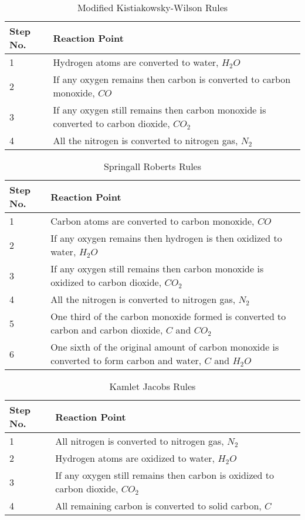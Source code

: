 \begin{table}[!h]
\centering
\begin{tabular}{|l|p{12cm}|}
\hline
Step No.       & Reaction Point \\
\hline \hline
1 & Hydrogen atoms are converted to water, $H_2O$         \\
\hline
2 & If any oxygen remains then carbon is converted to carbon monoxide, $CO$          \\
\hline
3 & If any oxygen still remains then carbon monoxide is converted to carbon dioxide, $CO_2$         \\
\hline
4 & All the nitrogen is converted to nitrogen gas, $N_2$          \\
\hline
\end{tabular}
\caption{Modified Kistiakowsky-Wilson Rules}
\label{m-k-w_rules}
\end{table}

\begin{table}[!h]
\centering
\begin{tabular}{|l|p{12cm}|}
\hline
Step No.       & Reaction Point \\
\hline \hline
1 & Carbon atoms are converted to carbon monoxide, $CO$         \\
\hline
2 & If any oxygen remains then hydrogen is then oxidized to water, $H_2O$          \\
\hline
3 & If any oxygen still remains then carbon monoxide is oxidized to carbon dioxide, $CO_2$         \\
\hline
4 & All the nitrogen is converted to nitrogen gas, $N_2$          \\
\hline
5 & One third of the carbon monoxide formed is converted to carbon and carbon dioxide, $C$ and $CO_2$          \\
\hline
6 & One sixth of the original amount of carbon monoxide is converted to form carbon and water, $C$ and $H_2O$          \\
\hline
\end{tabular}
\caption{Springall Roberts Rules}
\label{s-r_rules}
\end{table}

\begin{table}[!h]
\centering
\begin{tabular}{|l|p{12cm}|}
\hline
Step No.       & Reaction Point \\
\hline \hline
1 & All nitrogen is converted to nitrogen gas, $N_2$         \\
\hline
2 & Hydrogen atoms are oxidized to water, $H_2O$          \\
\hline
3 & If any oxygen still remains then carbon is oxidized to carbon dioxide, $CO_2$         \\
\hline
4 & All remaining carbon is converted to solid carbon, $C$          \\
\hline
\end{tabular}
\caption{Kamlet Jacobs Rules}
\label{k-j_rules}
\end{table}

